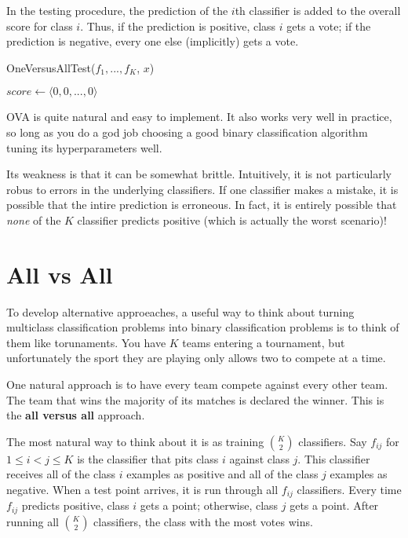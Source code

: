 In the testing procedure, the prediction of the \(i\)th classifier is added to the overall score for class \(i\). Thus, if the prediction is positive, class \(i\) gets a vote; if the prediction is negative, every one else (implicitly) gets a vote.

	\begin{algorithm}
		\caption{OneVersusAllTest($f_1,...,f_K$, $x$)}
		\label{alg:ovatest}
		$score \gets \langle 0,0,...,0 \rangle$\;
		\end{algorithm}

OVA is quite natural and easy to implement. It also works very well in practice, so long as you do a god job choosing a good binary classification algorithm tuning its hyperparameters well.

Its weakness is that it can be somewhat brittle. Intuitively, it is not particularly robus to errors in the underlying classifiers. If one classifier makes a mistake, it is possible that the intire prediction is erroneous. In fact, it is entirely possible that \emph{none} of the \(K\) classifier predicts positive (which is actually the worst scenario)!

\section{All vs All}
To develop alternative approeaches, a useful way to think about turning multiclass classification problems into binary classification problems is to think of them like torunaments. You have \(K\) teams entering a tournament, but unfortunately the sport they are playing only allows two to compete at a time. 

One natural approach is to have every team compete against every other team. The team that wins the majority of its matches is declared the winner. This is the \textbf{all versus all} approach.

The most natural way to think about it is as training \(K \choose 2\) classifiers. Say \(f_{ij}\) for \(1 \leq i < j \leq K\) is the classifier that pits class \(i\) against class \(j\). This classifier receives all of the class \(i\) examples as positive and all of the class \(j\) examples as negative. When a test point arrives, it is run through all \(f_{ij}\) classifiers. Every time \(f_{ij}\) predicts positive, class \(i\) gets a point; otherwise, class \(j\) gets a point. After running all \(K \choose 2\) classifiers, the class with the most votes wins.


